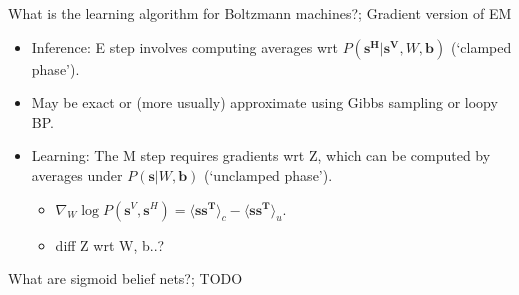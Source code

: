 \documentclass{article}
\begin{document}
What is the learning algorithm for Boltzmann machines?; Gradient version of EM \begin{itemize}
\item Inference: E step involves computing averages wrt $P(\mathbf{s^H|s^V}, W, \mathbf{b})$ (`clamped phase').
\item May be exact or (more usually) approximate using Gibbs sampling or loopy BP.
\item Learning: The M step requires gradients wrt Z, which can be computed by averages under $P(\mathbf{s}|W, \mathbf{b})$ (`unclamped phase'). \begin{itemize}
    \item $\nabla_W\log P(\mathbf{s}^V, \mathbf{s}^H)=\langle \mathbf{ss^T} \rangle_c - \langle \mathbf{ss^T} \rangle_u$.
    \item diff Z wrt W, b..?
\end{itemize}
\end{itemize}



What are sigmoid belief nets?; TODO
\end{document}

